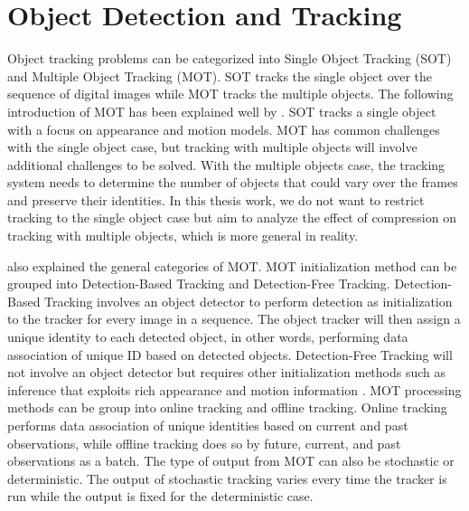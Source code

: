 \section{Object Detection and Tracking}
\label{sec:introduction/section_a}

Object tracking problems can be categorized into Single Object Tracking (SOT) and Multiple Object Tracking (MOT). SOT tracks the single object over the sequence of digital images while MOT tracks the multiple objects. The following introduction of MOT has been explained well by \citeauthor{luo_multiple_2021} \cite{luo_multiple_2021}. SOT tracks a single object with a focus on appearance and motion models. MOT has common challenges with the single object case, but tracking with multiple objects will involve additional challenges to be solved. With the multiple objects case, the tracking system needs to determine the number of objects that could vary over the frames and preserve their identities. In this thesis work, we do not want to restrict tracking to the single object case but aim to analyze the effect of compression on tracking with multiple objects, which is more general in reality.

\citeauthor{luo_multiple_2021} also explained the general categories of MOT. MOT initialization method can be grouped into Detection-Based Tracking and Detection-Free Tracking. Detection-Based Tracking involves an object detector to perform detection as initialization to the tracker for every image in a sequence. The object tracker will then assign a unique identity to each detected object, in other words, performing data association of unique ID based on detected objects. Detection-Free Tracking will not involve an object detector but requires other initialization methods such as inference that exploits rich appearance and motion information \cite{lin_detection-free_2016}. MOT processing methods can be group into online tracking and offline tracking. Online tracking performs data association of unique identities based on current and past observations, while offline tracking does so by future, current, and past observations as a batch. The type of output from MOT can also be stochastic or deterministic. The output of stochastic tracking varies every time the tracker is run while the output is fixed for the deterministic case.

